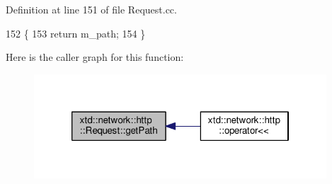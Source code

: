Definition at line 151 of file Request.\-cc.


\begin{DoxyCode}
152 \{
153   \textcolor{keywordflow}{return} m\_path;
154 \}
\end{DoxyCode}


Here is the caller graph for this function\-:
\nopagebreak
\begin{figure}[H]
\begin{center}
\leavevmode
\includegraphics[width=310pt]{classxtd_1_1network_1_1http_1_1Request_a0006f0a88dccabdafe9dfed3627730f6_icgraph}
\end{center}
\end{figure}


